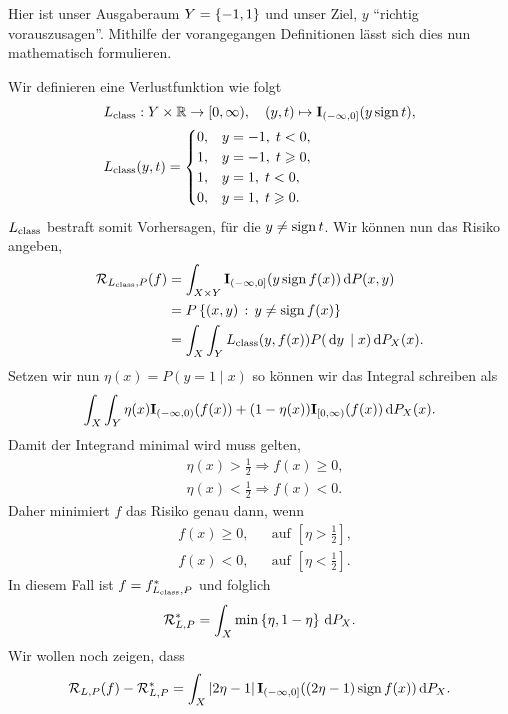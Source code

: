 \begin{bsp*}

Hier ist unser Ausgaberaum $Y=\left\{ -1,1 \right\}$ und unser
Ziel, $y$ ``richtig vorauszusagen''. Mithilfe der vorangegangen Definitionen
lässt sich dies nun mathematisch formulieren.

Wir definieren eine Verlustfunktion wie folgt
\begin{align*}
&L_{\mathrm{class}} : Y\times \mathbb{R}\to[0,\infty),\quad (y,t)\mapsto
\mathbf{I}_{(-\infty,0]}(y\operatorname{sign} t),\\
&L_{\mathrm{class}}(y,t) =
\begin{cases}
0, & y = -1,\; t<0,\\
1, & y = -1,\; t\geqslant0,\\
1, & y = 1,\; t<0,\\
0, & y = 1,\; t\geqslant0.
\end{cases} 
\end{align*}
$L_{\mathrm{class}}$ bestraft somit Vorhersagen, für die $y\neq \operatorname{sign} t$. Wir können nun
das Risiko angeben,
\begin{align*}
\mathcal{R}_{L_{\mathrm{class}},P}(f) &=
\int_{X\times Y} \mathbf{I}_{(-\infty,0]}(y\operatorname{sign} f(x)) \,\mathrm{d} P(x,y)\\
&= P\left\{ (x,y)\,:\,y\neq \operatorname{sign} f(x)\right\}\\
&= \int_X\int_Y L_{\mathrm{class}}(y,f(x))P(\,\mathrm{d} y\,\mid x)\,\mathrm{d} P_X(x).
\end{align*}
Setzen wir nun $\eta(x) = P(y=1\mid x)$ so können wir das Integral schreiben als
\begin{align*}
\int_X\int_Y \eta(x)\mathbf{I}_{(-\infty,0)}(f(x)) +
(1-\eta(x))\mathbf{I}_{[0,\infty)}(f(x))\,\mathrm{d} P_X(x).
\end{align*}
Damit der Integrand minimal wird muss gelten,
\begin{align*}
&\eta(x) > \frac{1}{2}\Rightarrow f(x)\ge 0,\\
&\eta(x) <\frac{1}{2}\Rightarrow f(x)< 0.
\end{align*}
Daher minimiert $f$ das Risiko genau dann, wenn
\begin{align*}
&f(x)\ge 0, && \text{auf } [\eta> \frac{1}{2}],\\ 
&f(x)< 0, && \text{auf } [\eta< \frac{1}{2}].
\end{align*}
In diesem Fall ist $f=f_{L_{\mathrm{class}},P}^*$ und folglich
\begin{align*}
\mathcal{R}_{L,P}^* = \int_X \min\left\{ \eta,1-\eta \right\}\,\mathrm{d} P_X.
\end{align*}
Wir wollen noch zeigen, dass
\begin{align*}
\RR_{L,P}(f) - \RR_{L,P}^* =
\int_X \abs{2\eta-1}\Id_{(-\infty,0]}((2\eta-1)\sign f(x))\dP_X.

\end{align*}
\end{bsp*}

